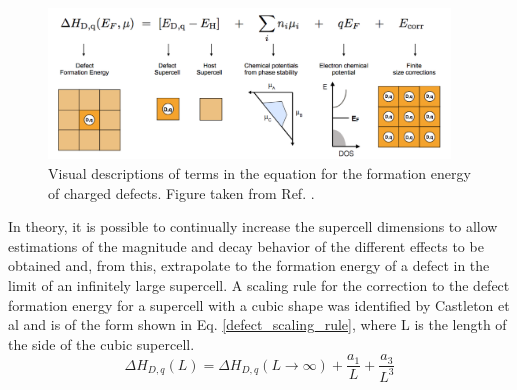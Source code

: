 \documentclass[11pt, twoside]{report}
\begin{document}
\begin{figure}[h!]
  \centering
    \includegraphics[width=0.95\textwidth]{figures/pylada_eq.png}
    \caption[Visual descriptions of terms in the equation for the formation energy of charged defects.]{Visual descriptions of terms in the equation for the formation energy of charged defects. Figure taken from Ref. .}
  \label{pylada_eq}
\end{figure}

In theory, it is possible to continually increase the supercell dimensions to allow estimations of the magnitude and decay behavior of the different effects to be obtained and, from this, extrapolate to the formation energy of a defect in the limit of an infinitely large supercell. A scaling rule for the correction to the defect formation energy for a supercell with a cubic shape was identified by Castleton et al \cite{supercell_scaling} and is of the form shown in Eq. \ref{defect_scaling_rule}, where L is the length of the side of the cubic supercell.
\begin{equation}\label{defect_scaling_rule}
\Delta H_{D,q}(L) = \Delta H_{D,q}(L \rightarrow \infty) + \frac{a_1}{L} + \frac{a_3}{L^3}
\end{equation}
\end{document}
